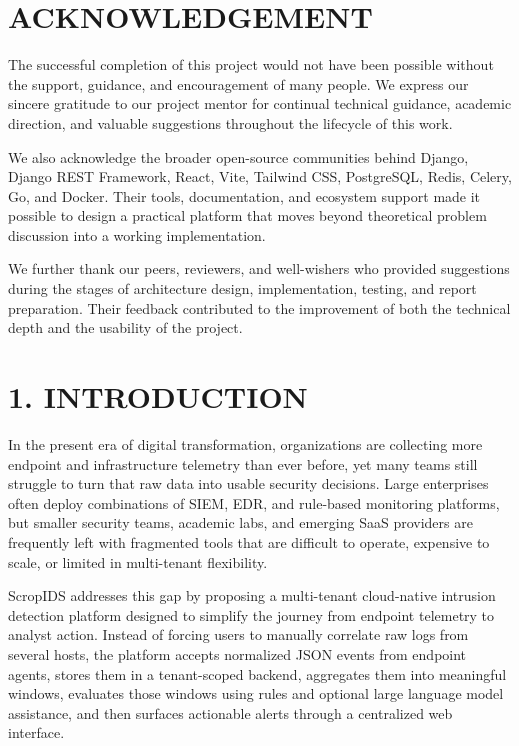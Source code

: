 \documentclass[12pt,a4paper]{article}
\begin{document}
\clearpage
\section*{ACKNOWLEDGEMENT}
The successful completion of this project would not have been possible without the support, guidance, and encouragement of many people. We express our sincere gratitude to our project mentor for continual technical guidance, academic direction, and valuable suggestions throughout the lifecycle of this work.

We also acknowledge the broader open-source communities behind Django, Django REST Framework, React, Vite, Tailwind CSS, PostgreSQL, Redis, Celery, Go, and Docker. Their tools, documentation, and ecosystem support made it possible to design a practical platform that moves beyond theoretical problem discussion into a working implementation.

We further thank our peers, reviewers, and well-wishers who provided suggestions during the stages of architecture design, implementation, testing, and report preparation. Their feedback contributed to the improvement of both the technical depth and the usability of the project.

\clearpage
\tableofcontents
\clearpage
{}
\setcounter{page}{1}

\section*{1. INTRODUCTION}
In the present era of digital transformation, organizations are collecting more endpoint and infrastructure telemetry than ever before, yet many teams still struggle to turn that raw data into usable security decisions. Large enterprises often deploy combinations of SIEM, EDR, and rule-based monitoring platforms, but smaller security teams, academic labs, and emerging SaaS providers are frequently left with fragmented tools that are difficult to operate, expensive to scale, or limited in multi-tenant flexibility.

ScropIDS addresses this gap by proposing a multi-tenant cloud-native intrusion detection platform designed to simplify the journey from endpoint telemetry to analyst action. Instead of forcing users to manually correlate raw logs from several hosts, the platform accepts normalized JSON events from endpoint agents, stores them in a tenant-scoped backend, aggregates them into meaningful windows, evaluates those windows using rules and optional large language model assistance, and then surfaces actionable alerts through a centralized web interface.
\end{document}
